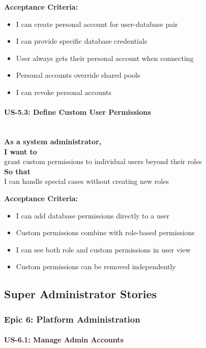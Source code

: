 \noindent\textbf{Acceptance Criteria:}
\begin{itemize}
    \item I can create personal account for user-database pair
    \item I can provide specific database credentials
    \item User always gets their personal account when connecting
    \item Personal accounts override shared pools
    \item I can revoke personal accounts
\end{itemize}

\paragraph{US-5.3: Define Custom User Permissions}
\mbox{}\\[0.5em]

\noindent\textbf{As a system administrator,} \\
\textbf{I want to} \\
grant custom permissions to individual users beyond their roles \\
\textbf{So that} \\
I can handle special cases without creating new roles

\noindent\textbf{Acceptance Criteria:}
\begin{itemize}
    \item I can add database permissions directly to a user
    \item Custom permissions combine with role-based permissions
    \item I can see both role and custom permissions in user view
    \item Custom permissions can be removed independently
\end{itemize}

\subsection{Super Administrator Stories}

\subsubsection{Epic 6: Platform Administration}

\paragraph{US-6.1: Manage Admin Accounts}
\mbox{}\\[0.5em]

